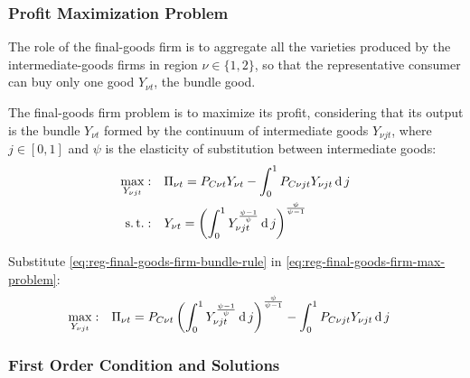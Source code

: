 \documentclass[
	thesis.tex
	]{subfiles}
\begin{document}
\subsubsection*{Profit Maximization Problem}

The role of the final-goods firm is to aggregate all the varieties produced by the intermediate-goods firms in region $\nu \in \{1,2\}$, so that the representative consumer can buy only one good $Y_{\nu t}$, the bundle good.



The final-goods firm problem is to maximize its profit, considering that its output is the bundle $Y_{\nu t}$ formed by the continuum of intermediate goods $Y_{\nu jt}$, where $j \in [0,1]$ and $\psi$ is the elasticity of substitution between intermediate goods:
\begin{align}
	\max_{Y_{\nu jt}}: &\quad \Pi_{\nu t} = P_{C\nu t} Y_{\nu t} - \int_{0}^{1} P_{C\nu jt} Y_{\nu jt} \operatorname{d} j \label{eq:reg-final-goods-firm-max-problem} \\
	\operatorname{s.t.}: & \quad Y_{\nu t} = \left( \int_{0}^{1} Y_{\nu jt}^{\frac{\psi-1}{\psi}} \operatorname{d} j \right)^{\frac{\psi}{\psi-1}} \label{eq:reg-final-goods-firm-bundle-rule}
\end{align}

Substitute \ref{eq:reg-final-goods-firm-bundle-rule} in \ref{eq:reg-final-goods-firm-max-problem}:
\begin{align}
	\label{eq:reg-final-goods-firm-max-problem-2}
	\max_{Y_{\nu jt}}: & \quad \Pi_{\nu t} = P_{C\nu t} \left( \int_{0}^{1} Y_{\nu jt}^{\frac{\psi-1}{\psi}} \operatorname{d} j \right)^{\frac{\psi}{\psi-1}} - \int_{0}^{1} P_{C\nu jt} Y_{\nu jt} \operatorname{d} j
\end{align}

\subsubsection*{First Order Condition and Solutions}
\end{document}
